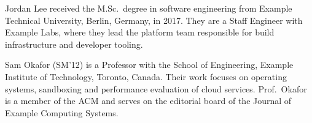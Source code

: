 \documentclass[journal]{IEEEtran}
\begin{document}
{Jordan Lee}
received the M.Sc.\ degree in software engineering from Example Technical
University, Berlin, Germany, in 2017. They are a Staff Engineer with Example
Labs, where they lead the platform team responsible for build infrastructure
and developer tooling.
\end{IEEEbiography}

{Sam Okafor}
(SM'12) is a Professor with the School of Engineering, Example Institute of
Technology, Toronto, Canada. Their work focuses on operating systems,
sandboxing and performance evaluation of cloud services. Prof.\ Okafor is a
member of the ACM and serves on the editorial board of the Journal of
Example Computing Systems.
\end{IEEEbiography}
\end{document}
